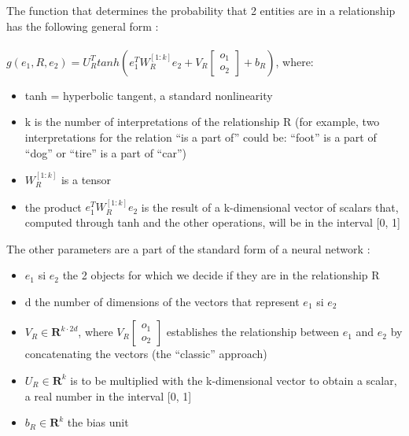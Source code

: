 \documentclass{article}
\begin{document}
The function that determines the probability that 2 entities are in a relationship has the following general form \cite{NTN}: \\ \\ 
$g(e_1, R, e_2) = U_R^T tanh(e_1^T W_R^{[1:k]}e_2 + V_R \left[\begin{smallmatrix} o_1 \\ o_2 \end{smallmatrix}\right] + b_R)$, where:\\
\begin{itemize}
	\item tanh = hyperbolic tangent, a standard nonlinearity
	\item k is the number of interpretations of the relationship R  (for example, two interpretations for the relation ``is a part of'' could be: ``foot'' is a part of ``dog'' or ``tire'' is a part of ``car'')
	\item $W_R^{[1:k]}$ is a tensor
	\item the product $e_1^T W_R^{[1:k]}e_2$ is the result of a k-dimensional vector of scalars that, computed through tanh and the other operations, will be in the interval [0, 1]
\end{itemize}

The other parameters are a part of the standard form of a neural network \cite{NTN}:\\
\begin{itemize}
	\item $e_1$ si $e_2$ the 2 objects for which we decide if they are in the relationship R
	\item d the number of dimensions of the vectors that represent $e_1$ si $e_2$
	\item $V_R \in \mathbf{R}^{k \cdot 2d}$, where $V_R \left[\begin{smallmatrix} o_1 \\ o_2 \end{smallmatrix}\right]$ establishes the relationship between $e_1$ and $e_2$ by concatenating the vectors (the ``classic'' approach)
	\item $U_R \in \mathbf{R}^k$ is to be multiplied with the k-dimensional vector to obtain a scalar, a real number in the interval [0, 1]
	\item $b_R \in \mathbf{R}^k$ the bias unit
\end{itemize}
\end{document}
